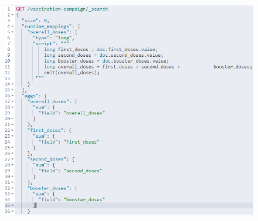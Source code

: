 \documentclass{article}[IEEEtran]
\begin{document}
\begin{figure}[H]
\begin{center}
\begin{minipage}[b]{0.4\textwidth}
    \includegraphics[width=\textwidth, frame]{Query_2.PNG}
    \subcaption{}
  \end{minipage}
  \hfill
  \begin{minipage}[b]{0.4\textwidth}

\end{minipage}
\end{center}
\end{figure}
\end{document}

